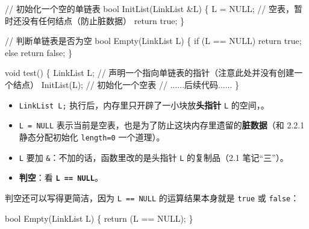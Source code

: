 \documentclass[10.5pt,a4paper,oneside]{article}
\newcommand{\hlred}[1]{\textcolor{wdred}{\bfseries #1}}
\newcommand{\uln}[1]{\CJKunderline[format=\color{wdred},thickness=0.9pt,depth=0.28em]{#1}}
\providecommand{\tightlist}{\setlength{\itemsep}{2pt}\setlength{\parskip}{0pt}}
\newenvironment{Shaded}{}{}
\newcommand{\CommentTok}[1]{\textcolor[rgb]{0.18,0.55,0.23}{#1}}
\newcommand{\ControlFlowTok}[1]{\textcolor[rgb]{0.12,0.31,0.71}{#1}}
\newcommand{\DataTypeTok}[1]{\textcolor[rgb]{0.12,0.31,0.71}{#1}}
\newcommand{\KeywordTok}[1]{\textcolor[rgb]{0.12,0.31,0.71}{#1}}
\newcommand{\NormalTok}[1]{#1}
\newcommand{\OperatorTok}[1]{\textcolor[rgb]{0.20,0.20,0.20}{#1}}
\begin{document}
\begin{Shaded}
\begin{Highlighting}[]
\CommentTok{// 初始化一个空的单链表}
\DataTypeTok{bool}\NormalTok{ InitList}\OperatorTok{(}\NormalTok{LinkList }\OperatorTok{\&}\NormalTok{L}\OperatorTok{)} \OperatorTok{\{}
\NormalTok{    L }\OperatorTok{=}\NormalTok{ NULL}\OperatorTok{;}           \CommentTok{// 空表，暂时还没有任何结点（防止脏数据）}
    \ControlFlowTok{return} \KeywordTok{true}\OperatorTok{;}
\OperatorTok{\}}

\CommentTok{// 判断单链表是否为空}
\DataTypeTok{bool}\NormalTok{ Empty}\OperatorTok{(}\NormalTok{LinkList L}\OperatorTok{)} \OperatorTok{\{}
    \ControlFlowTok{if} \OperatorTok{(}\NormalTok{L }\OperatorTok{==}\NormalTok{ NULL}\OperatorTok{)}
        \ControlFlowTok{return} \KeywordTok{true}\OperatorTok{;}
    \ControlFlowTok{else}
        \ControlFlowTok{return} \KeywordTok{false}\OperatorTok{;}
\OperatorTok{\}}

\DataTypeTok{void}\NormalTok{ test}\OperatorTok{()} \OperatorTok{\{}
\NormalTok{    LinkList L}\OperatorTok{;}         \CommentTok{// 声明一个指向单链表的指针（注意此处并没有创建一个结点）}
\NormalTok{    InitList}\OperatorTok{(}\NormalTok{L}\OperatorTok{);}        \CommentTok{// 初始化一个空表}
    \CommentTok{// ......后续代码......}
\OperatorTok{\}}
\end{Highlighting}
\end{Shaded}

\begin{itemize}
\tightlist
\item
  \texttt{LinkList\ L;} 执行后，内存里只开辟了一小块放\textbf{头指针}
  \texttt{L} 的空间，\uln{并没有创建任何结点}。
\item
  \texttt{L\ =\ NULL}
  表示当前是空表，也是为了防止这块内存里遗留的\textbf{脏数据}（和 2.2.1
  静态分配初始化 \texttt{length=0} 一个道理）。
\item
  \texttt{L} 要加 \texttt{\&}：不加的话，函数里改的是头指针 \texttt{L}
  的复制品（2.1 笔记“三”）。
\item
  \textbf{判空}：看 \hlred{\texttt{L\ ==\ NULL}}。
\end{itemize}

判空还可以写得更简洁，因为 \texttt{L\ ==\ NULL} 的运算结果本身就是
\texttt{true} 或 \texttt{false}：

\begin{Shaded}
\begin{Highlighting}[]
\DataTypeTok{bool}\NormalTok{ Empty}\OperatorTok{(}\NormalTok{LinkList L}\OperatorTok{)} \OperatorTok{\{}
    \ControlFlowTok{return} \OperatorTok{(}\NormalTok{L }\OperatorTok{==}\NormalTok{ NULL}\OperatorTok{);}
\OperatorTok{\}}
\end{Highlighting}
\end{Shaded}
\end{document}
